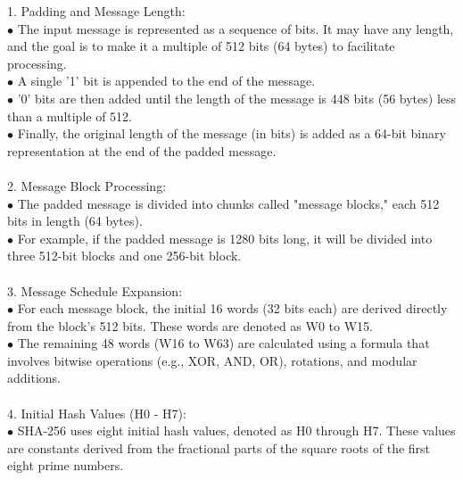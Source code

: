 \documentclass{report}
\begin{document}
1. Padding and Message Length:\\
$\bullet$ The input message is represented as a sequence of bits. It may have any length, and the goal is to make it a multiple of 512 bits (64 bytes) to facilitate processing.\\
$\bullet$ A single '1' bit is appended to the end of the message.\\
$\bullet$ '0' bits are then added until the length of the message is 448 bits (56 bytes) less than a multiple of 512.\\
$\bullet$ Finally, the original length of the message (in bits) is added as a 64-bit binary representation at the end of the padded message.\\
\\
2. Message Block Processing:\\
$\bullet$ The padded message is divided into chunks called "message blocks," each 512 bits in length (64 bytes).\\
$\bullet$ For example, if the padded message is 1280 bits long, it will be divided into three 512-bit blocks and one 256-bit block.\\
\\
3. Message Schedule Expansion:\\
$\bullet$ For each message block, the initial 16 words (32 bits each) are derived directly from the block's 512 bits. These words are denoted as W0 to W15.\\
$\bullet$ The remaining 48 words (W16 to W63) are calculated using a formula that involves bitwise operations (e.g., XOR, AND, OR), rotations, and modular additions.\\
\\
4. Initial Hash Values (H0 - H7):\\
$\bullet$ SHA-256 uses eight initial hash values, denoted as H0 through H7. These values are constants derived from the fractional parts of the square roots of the first eight prime numbers. \quad\\
\end{document}
